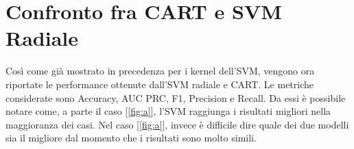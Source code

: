 \begin{table}[H]
\centering
{}
\caption{Risultati dei diversi kernel sul testset con Standardizzazione e rimozione outliers}
\label{tab:my-table}
\end{table}

\begin{table}[H]
\centering
{}
\caption{Risultati dei diversi kernel sul testset con Standardizzazione + PCA e rimozione outliers}
\label{tab:my-table}
\end{table}


\newpage


\section{Confronto fra CART e SVM Radiale}
Così come già mostrato in precedenza per i kernel dell'SVM, vengono ora riportate le performance ottenute dall'SVM radiale e CART. Le metriche considerate sono Accuracy, AUC PRC, F1, Precision e Recall.
Da essi è possibile notare come, a parte il caso [\ref{fig:a}], l'SVM raggiunga i risultati migliori nella maggioranza dei casi.
Nel caso [\ref{fig:a}], invece è difficile dire quale dei due modelli sia il migliore dal momento che i risultati sono molto simili.



